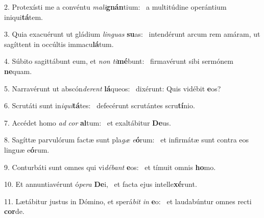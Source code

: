 2. Protexísti me a convéntu \textit{ma}\textit{li}\textbf{gnán}tium: \ast\  a multitúdine operántium iniqui\textbf{tá}tem.\

3. Quia exacuérunt ut gládium \textit{lin}\textit{guas} \textbf{su}as: \ast\  intendérunt arcum rem amáram, ut sagíttent in occúltis immacu\textbf{lá}tum.\

4. Súbito sagittábunt eum, et \textit{non} \textit{ti}\textbf{mé}bunt: \ast\  firmavérunt sibi sermónem \textbf{ne}quam.\

5. Narravérunt ut abscón\textit{de}\textit{rent} \textbf{lá}queos: \ast\  dixérunt: Quis vidébit \textbf{e}os?\

6. Scrutáti sunt in\textit{i}\textit{qui}\textbf{tá}tes: \ast\  defecérunt scrutántes scru\textbf{tí}nio.\

7. Accédet homo \textit{ad} \textit{cor} \textbf{al}tum: \ast\  et exaltábitur \textbf{De}us.\

8. Sagíttæ parvulórum factæ sunt pla\textit{gæ} \textit{e}\textbf{ó}rum: \ast\  et infirmátæ sunt contra eos linguæ e\textbf{ó}rum.\

9. Conturbáti sunt omnes qui vi\textit{dé}\textit{bant} \textbf{e}os: \ast\  et tímuit omnis \textbf{ho}mo.\

10. Et annuntiavérunt ó\textit{pe}\textit{ra} \textbf{De}i, \ast\  et facta ejus intelle\textbf{xé}runt.\

11. Lætábitur justus in Dómino, et sperá\textit{bit} \textit{in} \textbf{e}o: \ast\  et laudabúntur omnes recti \textbf{cor}de.\

